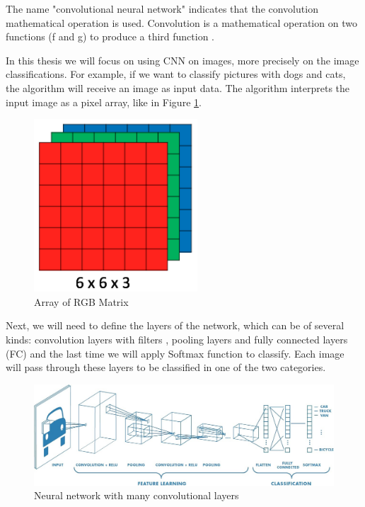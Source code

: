 The name "convolutional neural network" indicates that the convolution mathematical operation is used. 
Convolution is a mathematical operation on two functions (f and g) to produce a third function \cite{Mallat:2008:WTS:1525499}. 

In this thesis we will focus on using CNN on images, more precisely on the image classifications.
For example, if we want to classify pictures with dogs and cats,
the algorithm will receive an image as input data.
The algorithm interprets the input image as a pixel array, like in Figure \ref{fig:img-rgb}.

\begin{figure}[htbp]
  \centerline{\includegraphics[scale=0.75]{fig/img-rgb.png}}  
  \caption{Array of RGB Matrix}
  \label{fig:img-rgb}
\end{figure}

Next, we will need to define the layers of the network, 
which can be of several kinds: convolution layers with filters , pooling layers and fully connected layers (FC)
and the last time we will apply Softmax function to classify.
 Each image will pass through these layers to be classified in one of the two categories.


 \begin{figure}[htbp]
  \centerline{\includegraphics[scale=0.35]{fig/cnn.jpeg}}  
  \caption{Neural network with many convolutional layers \cite{cnn-mathworks}}
  \label{fig:cnn-arhitecture}
\end{figure}



